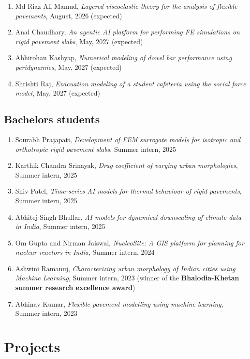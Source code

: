 \documentclass[12pt]{article}
\begin{document}
\begin{enumerate}
	\item Md Riaz Ali Mamud, \textit{Layered viscoelastic theory for the analysis of flexible pavements}, August, 2026 (expected)
	\item Anal Chaudhary, \textit{An agentic AI platform for performing FE simulations on rigid pavement slabs}, May, 2027 (expected)
	\item Abhirohan Kashyap, \textit{Numerical modeling of dowel bar performance using peridynamics}, May, 2027 (expected)
	\item Shrishti Raj, \textit{Evacuation modeling of a student cafeteria using the social force model}, May, 2027 (expected)
\end{enumerate}

\hfill
\subsection*{Bachelors students}
\begin{enumerate}
	\item Sourabh Prajapati, \textit{Development of FEM surrogate models for isotropic and orthotropic rigid pavement slabs}, Summer intern, 2025
	\item Karthik Chandra Srinayak, \textit{Drag coefficient of varying urban morphologies}, Summer intern, 2025
	\item Shiv Patel, \textit{Time-series AI models for thermal behaviour of rigid pavements}, Summer intern, 2025
	\item Abhitej Singh Bhullar, \textit{AI models for dynamical downscaling of climate data in India}, Summer intern, 2025
	\item Om Gupta and Nirman Jaiswal, \textit{NucleoSite: A GIS platform for planning for nuclear reactors in India}, Summer intern, 2024
	\item Ashwini Ramanuj,  \textit{Characterizing urban morphology of Indian cities using Machine Learning}, Summer intern, 2023 (winner of the \textbf{Bhalodia-Khetan summer research excellence award})
	\item Abhinav Kumar, \textit{Flexible pavement modelling using machine learning}, Summer intern, 2023 
\end{enumerate}

\bigskip
\section*{Projects}
\hfill
\end{document}
